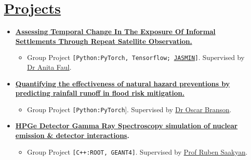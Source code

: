\documentclass[10pt,a4paper,roman]{moderncv}
\begin{document}
\section{\href{http://www.damtp.cam.ac.uk/user/is500/}{Projects}}
\vspace*{-1mm}
{\begin{itemize} 

\item\textbf{\href{https://drive.google.com/file/d/1eYCfZCaRkPdXVgs2PZuccc4DCk1VL52P/view}{Assessing Temporal Change In The Exposure Of Informal Settlements Through Repeat Satellite Observation.}} \textit{ \enspace \enspace  \enspace  \enspace  \enspace  \enspace  \enspace \enspace  \enspace  \enspace \enspace  {}}
{\begin{itemize}  \item  Group Project \texttt{[Python:PyTorch, Tensorflow; \href{http://www.jasmin.ac.uk/about/}{JASMIN}]}. Supervised by \href{https://www.c2d3.cam.ac.uk/directory/248/dr-anita-faul}{Dr Anita Faul}.\end{itemize}}

\item\textbf{ \href{http://github.com/ai4er-cdt/flood_risk_shipston}{Quantifying the effectiveness of natural hazard preventions by predicting rainfall runoff in flood risk mitigation.}} \textit{\enspace \enspace  \enspace  \enspace  \enspace  \enspace  \enspace \enspace  \enspace  {}}
{\begin{itemize} \item Group Project \texttt{[Python:PyTorch}]. Supervised by \href{https://www.esc.cam.ac.uk/directory/oscar-branson}{Dr Oscar Branson}. \end{itemize}}

\item\textbf{ \href{http://ira-shokar.github.io/Docs/Final_Report_-_Nuclear_Forensics_with_Gamma_Ray_Spectroscopy.pdf}{HPGe Detector Gamma Ray Spectroscopy simulation of nuclear emission \& detector interactions}.} \textit{\enspace \enspace  \enspace  \enspace  \enspace  \enspace  \enspace \enspace  \enspace  \enspace \enspace \enspace  \enspace  \enspace  \enspace  \enspace  \enspace \enspace  \enspace  \enspace  \enspace \enspace  \enspace  {}} 
{\begin{itemize} \item Group Project \texttt{[C++:ROOT, GEANT4]}. Supervised by \href{https://www.ucl.ac.uk/physics-astronomy/people/professor-ruben-saakyan}{Prof Ruben Saakyan}. \end{itemize}}


\end{itemize}}
\end{document}
